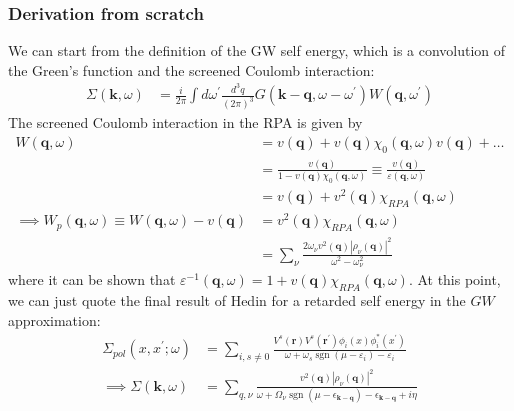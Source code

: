 \subsubsection{Derivation from scratch}
We can start from the definition of the GW self energy, which is a convolution of the Green's function and the screened Coulomb interaction:
\begin{align}
    \Sigma(\mathbf{k}, \omega)&=\frac{i}{2 \pi} \int d \omega^{\prime} \frac{d^3 q}{(2 \pi)^3} G\left(\mathbf{k}-\mathbf{q}, \omega-\omega^{\prime}\right) W\left(\mathbf{q}, \omega^{\prime}\right)
\end{align}
 The screened Coulomb interaction in the RPA is given by 
\begin{align}
W(\mathbf{q}, \omega)&= v(\mathbf{q}) + v(\mathbf{q}) \chi_0(\mathbf{q}, \omega) v(\mathbf{q})  + \ldots \\
&= \frac{v(\mathbf{q})}{1-v(\mathbf{q}) \chi_0{(\mathbf{q}, \omega)}} \equiv \frac{v(\mathbf{q})}{\varepsilon(\mathbf{q}, \omega)}  \\
&= v(\mathbf{q}) + v^2(\mathbf{q}) \chi_{RPA}(\mathbf{q}, \omega)\\
\implies W_{p}(\mathbf{q}, \omega) \equiv W(\mathbf{q}, \omega) - v(\mathbf{q}) &= v^2(\mathbf{q}) \chi_{RPA}(\mathbf{q}, \omega) \\
&= \sum_{\nu} \frac{2 \omega_\nu v^2(\mathbf{q}) |\rho_\nu(\mathbf{q})|^2}{\omega^2 - \omega_\nu^2}
\end{align}
where it can be shown that $\varepsilon^{-1}(\mathbf{q}, \omega) = 1 + v(\mathbf{q}) \chi_{RPA}(\mathbf{q}, \omega)$. At this point, we can just quote the final result of Hedin for a retarded self energy in the $GW$ approximation:
\begin{align}
\Sigma_{p o l}\left(x, x^{\prime} ; \omega\right)&=\sum_{i, s \neq 0} \frac{V^s(\boldsymbol{r}) V^s\left(\boldsymbol{r}^{\prime}\right) \phi_i(x) \phi_i^*\left(x^{\prime}\right)}{\omega+\omega_s \operatorname{sgn}\left(\mu-\varepsilon_i\right)-\varepsilon_i} \\
\implies
    \Sigma (\bm{k}, \omega) 
    &=\sum_{q, \nu} \frac{ v^2(\mathbf{q}) |\rho_\nu(\mathbf{q})|^2}{\omega + \Omega_\nu \operatorname{sgn}(\mu - \epsilon_{\bm{k}-\bm{q}}) - \epsilon_{\bm{k}-\bm{q}} + i \eta}
\end{align}
